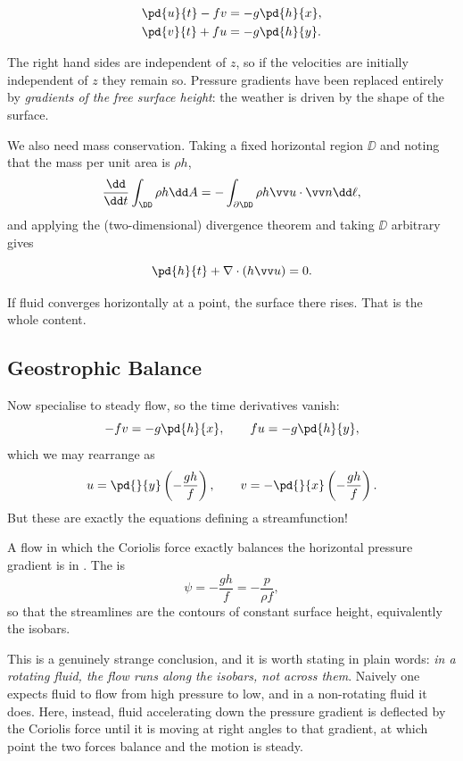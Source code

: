 \begin{proposition}
	\begin{align*}
		\pd{u}{t} - fv &= -g\pd{h}{x}, \\
		\pd{v}{t} + fu &= -g\pd{h}{y}.
	\end{align*}
\end{proposition}

The right hand sides are independent of $z$, so if the velocities are initially independent of $z$ they remain so. Pressure gradients have been replaced entirely by \emph{gradients of the free surface height}: the weather is driven by the shape of the surface.

We also need mass conservation. Taking a fixed horizontal region $\DD$ and noting that the mass per unit area is $\rho h$,
$$
\frac{\dd}{\dd t}\int_\DD \rho h \dd A = -\int_{\partial\DD} \rho h \vv u \cdot \vv n \dd \ell,
$$
and applying the (two-dimensional) divergence theorem and taking $\DD$ arbitrary gives

\begin{proposition}
	$$
	\pd{h}{t} + \nabla\cdot(h\vv u) = 0.
	$$
\end{proposition}

If fluid converges horizontally at a point, the surface there rises. That is the whole content.

\subsection{Geostrophic Balance}

Now specialise to steady flow, so the time derivatives vanish:
$$
-fv = -g\pd{h}{x}, \qquad fu = -g\pd{h}{y},
$$
which we may rearrange as
$$
u = \pd{}{y}\left(-\frac{gh}{f}\right), \qquad v = -\pd{}{x}\left(-\frac{gh}{f}\right).
$$
But these are exactly the equations defining a streamfunction!

\begin{definition}
	A flow in which the Coriolis force exactly balances the horizontal pressure gradient is in . The  is
	$$
	\psi = -\frac{gh}{f} = -\frac{p}{\rho f},
	$$
	so that the streamlines are the contours of constant surface height, equivalently the isobars.
\end{definition}

This is a genuinely strange conclusion, and it is worth stating in plain words: \emph{in a rotating fluid, the flow runs along the isobars, not across them}. Naively one expects fluid to flow from high pressure to low, and in a non-rotating fluid it does. Here, instead, fluid accelerating down the pressure gradient is deflected by the Coriolis force until it is moving at right angles to that gradient, at which point the two forces balance and the motion is steady.

